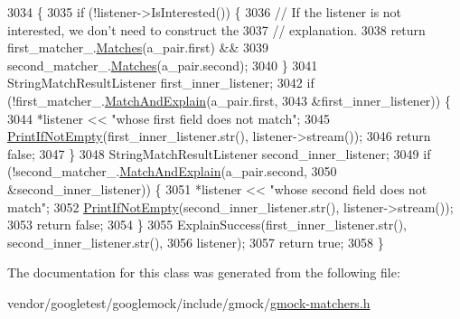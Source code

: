 \begin{DoxyCode}
3034                                                                     \{
3035     \textcolor{keywordflow}{if} (!listener->IsInterested()) \{
3036       \textcolor{comment}{// If the listener is not interested, we don't need to construct the}
3037       \textcolor{comment}{// explanation.}
3038       \textcolor{keywordflow}{return} first\_matcher\_.\hyperlink{classtesting_1_1internal_1_1MatcherBase_a105a9dae7afecee8898db8ad1887b0db}{Matches}(a\_pair.first) &&
3039              second\_matcher\_.\hyperlink{classtesting_1_1internal_1_1MatcherBase_a105a9dae7afecee8898db8ad1887b0db}{Matches}(a\_pair.second);
3040     \}
3041     StringMatchResultListener first\_inner\_listener;
3042     \textcolor{keywordflow}{if} (!first\_matcher\_.\hyperlink{classtesting_1_1internal_1_1MatcherBase_ae3f5f3150a95cafb1c2ab7c864a42e65}{MatchAndExplain}(a\_pair.first,
3043                                         &first\_inner\_listener)) \{
3044       *listener << \textcolor{stringliteral}{"whose first field does not match"};
3045       \hyperlink{namespacetesting_1_1internal_a77c9e2b66d2b2414db4763971180d53c}{PrintIfNotEmpty}(first\_inner\_listener.str(), listener->stream());
3046       \textcolor{keywordflow}{return} \textcolor{keyword}{false};
3047     \}
3048     StringMatchResultListener second\_inner\_listener;
3049     \textcolor{keywordflow}{if} (!second\_matcher\_.\hyperlink{classtesting_1_1internal_1_1MatcherBase_ae3f5f3150a95cafb1c2ab7c864a42e65}{MatchAndExplain}(a\_pair.second,
3050                                          &second\_inner\_listener)) \{
3051       *listener << \textcolor{stringliteral}{"whose second field does not match"};
3052       \hyperlink{namespacetesting_1_1internal_a77c9e2b66d2b2414db4763971180d53c}{PrintIfNotEmpty}(second\_inner\_listener.str(), listener->stream());
3053       \textcolor{keywordflow}{return} \textcolor{keyword}{false};
3054     \}
3055     ExplainSuccess(first\_inner\_listener.str(), second\_inner\_listener.str(),
3056                    listener);
3057     \textcolor{keywordflow}{return} \textcolor{keyword}{true};
3058   \}
\end{DoxyCode}


The documentation for this class was generated from the following file\+:\begin{DoxyCompactItemize}
\item 
vendor/googletest/googlemock/include/gmock/\hyperlink{gmock-matchers_8h}{gmock-\/matchers.\+h}\end{DoxyCompactItemize}

